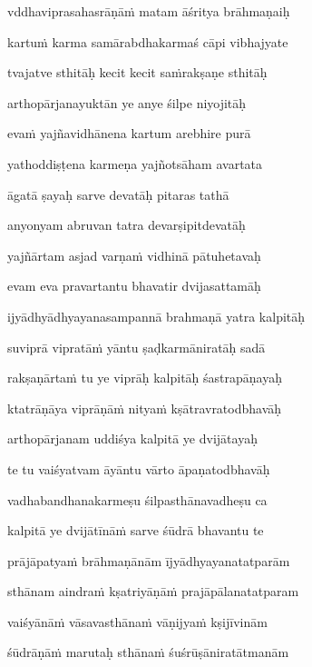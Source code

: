 vddhaviprasahasrāṇāṁ matam āśritya brāhmaṇaiḥ\thinspace{\dandab} \dontdisplaylinenum

kartuṁ karma samārabdhakarmaś cāpi vibhajyate \veg\dontdisplaylinenum

tvajatve sthitāḥ kecit kecit saṁrakṣaṇe sthitāḥ\thinspace{\dandab} \dontdisplaylinenum

arthopārjanayuktān ye anye śilpe niyojitāḥ \veg\dontdisplaylinenum

evaṁ yajñavidhānena kartum arebhire purā\thinspace{\dandab} \dontdisplaylinenum

yathoddiṣṭena karmeṇa yajñotsāham avartata \veg\dontdisplaylinenum

āgatā ṣayaḥ sarve devatāḥ pitaras tathā\thinspace{\dandab} \dontdisplaylinenum

anyonyam abruvan tatra devarṣipitdevatāḥ \veg\dontdisplaylinenum

yajñārtam asjad varṇaṁ vidhinā pātuhetavaḥ\thinspace{\dandab} \dontdisplaylinenum

evam eva pravartantu bhavatir dvijasattamāḥ \veg\dontdisplaylinenum

ijyādhyādhyayanasampannā brahmaṇā yatra kalpitāḥ\thinspace{\dandab} \dontdisplaylinenum

suviprā vipratāṁ yāntu ṣaḍkarmāniratāḥ sadā \veg\dontdisplaylinenum

rakṣaṇārtaṁ tu ye viprāḥ kalpitāḥ śastrapāṇayaḥ\thinspace{\dandab} \dontdisplaylinenum

ktatrāṇāya viprāṇāṁ nityaṁ kṣātravratodbhavāḥ \veg\dontdisplaylinenum

arthopārjanam uddiśya kalpitā ye dvijātayaḥ\thinspace{\dandab} \dontdisplaylinenum

te tu vaiśyatvam āyāntu vārto āpaṇatodbhavāḥ \danda\dontdisplaylinenum

vadhabandhanakarmeṣu śilpasthānavadheṣu ca \veg\dontdisplaylinenum

kalpitā ye dvijātīnāṁ sarve śūdrā bhavantu te\thinspace{\dandab} \dontdisplaylinenum

prājāpatyaṁ brāhmaṇānām ījyādhyayanatatparām \veg\dontdisplaylinenum

sthānam aindraṁ kṣatriyāṇāṁ prajāpālanatatparam\thinspace{\dandab} \dontdisplaylinenum

vaiśyānāṁ vāsavasthānaṁ vāṇijyaṁ kṣijīvinām \veg\dontdisplaylinenum

śūdrāṇāṁ marutaḥ sthānaṁ śuśrūṣāniratātmanām\thinspace{\dandab} \dontdisplaylinenum

